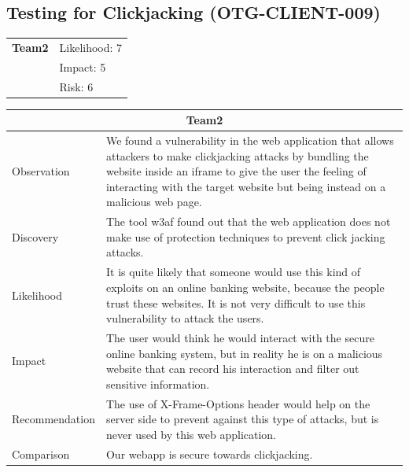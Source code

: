 \documentclass[headsepline,footsepline,footinclude=false,oneside,fontsize=11pt,paper=a4,listof=totoc,bibliography=totoc]{scrbook} %
\begin{document}
\subsection{Testing for Clickjacking (OTG-CLIENT-009) }
\begin{tabular}{cR{12cm}}
	\textbf{Team2} & Likelihood: 7\\& Impact: 5\\& Risk: 6
\end{tabular}

\begin{tabular}{ l|p{11cm}  }
	\hline
	\multicolumn{2}{c}{\textbf{Team2}} \\
	\hline
	Observation   & We found a vulnerability in the web application that allows
	attackers to make clickjacking attacks by bundling the website
	inside an iframe to give the user the feeling of interacting with
	the target website but being instead on a malicious web page.  \\
	Discovery  & The tool w3af found out that the web application does not make
	use of protection techniques to prevent click jacking attacks.  \\
	Likelihood &  It is quite likely that someone would use this kind of exploits
	on an online banking website, because the people trust these
	websites. It is not very difficult to use this vulnerability to attack
	the users. \\
	Impact    & The user would think he would interact with the secure online
	banking system, but in reality he is on a malicious website that
	can record his interaction and filter out sensitive information. \\
	Recommendation & The use of X-Frame-Options header would help on the server side to
	prevent against this type of attacks, but is never used by this web
	application.  \\
	Comparison & Our webapp is secure towards clickjacking.\\
	\hline
\end{tabular}
\\
\vspace{0.5cm}
\\
\end{document}
